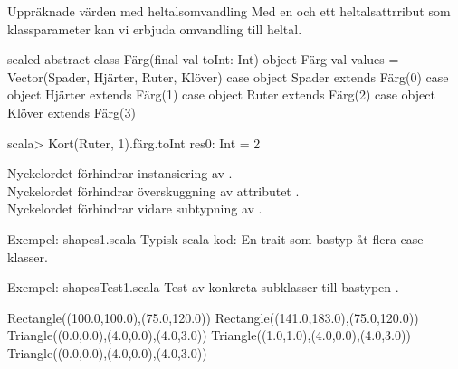 \begin{Slide}{Uppräknade värden med heltalsomvandling}\SlideFontSmall
Med en  och ett heltalsattrribut  som klassparameter kan vi erbjuda omvandling till heltal.
\begin{Code}
sealed abstract class Färg(final val toInt: Int)
object Färg { 
  val values = Vector(Spader, Hjärter, Ruter, Klöver)
}
case object Spader  extends Färg(0)
case object Hjärter extends Färg(1)
case object Ruter   extends Färg(2)
case object Klöver  extends Färg(3)
\end{Code}

\begin{REPL}
scala> Kort(Ruter, 1).färg.toInt
res0: Int = 2
\end{REPL}
Nyckelordet  förhindrar instansiering av . \\
Nyckelordet  förhindrar överskuggning av attributet . \\
Nyckelordet  förhindrar vidare subtypning av .
\end{Slide}





\begin{Slide}{Exempel: shapes1.scala}
Typisk scala-kod: En trait som bastyp åt flera case-klasser.
\end{Slide}

\begin{Slide}{Exempel: shapesTest1.scala}
Test av konkreta subklasser till bastypen .

\begin{REPL}
Rectangle((100.0,100.0),(75.0,120.0))
Rectangle((141.0,183.0),(75.0,120.0))
Triangle((0.0,0.0),(4.0,0.0),(4.0,3.0))
Triangle((1.0,1.0),(4.0,0.0),(4.0,3.0))
Triangle((0.0,0.0),(4.0,0.0),(4.0,3.0))
\end{REPL}
\end{Slide}


